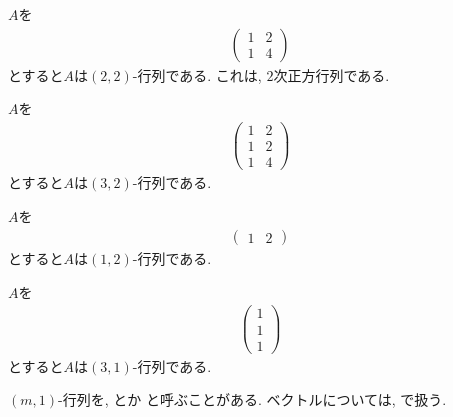 \begin{example}
  $A$を
  \begin{align*}
    \begin{pmatrix}
      1&2\\
      1&4
    \end{pmatrix}
  \end{align*}
  とすると$A$は$(2,2)$-行列である.
  これは, $2$次正方行列である.
\end{example}
\begin{example}
  $A$を
  \begin{align*}
    \begin{pmatrix}
      1&2\\
      1&2\\
      1&4
    \end{pmatrix}
  \end{align*}
  とすると$A$は$(3,2)$-行列である.
\end{example}
\begin{example}
    $A$を
  \begin{align*}
    \begin{pmatrix}
      1&2
    \end{pmatrix}
  \end{align*}
  とすると$A$は$(1,2)$-行列である.
\end{example}

\begin{example}
    $A$を
  \begin{align*}
    \begin{pmatrix}
      1\\
      1\\
      1
    \end{pmatrix}
  \end{align*}
  とすると$A$は$(3,1)$-行列である.
\end{example}

\begin{remark}
  $(m,1)$-行列を,
  とか
  と呼ぶことがある.
  ベクトルについては, で扱う.
\end{remark}

